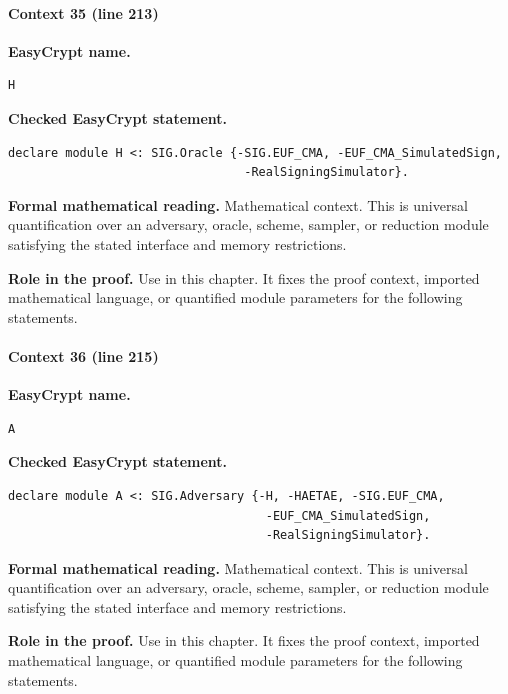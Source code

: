 \paragraph{Context 35 (line 213)}
\noindent\textbf{EasyCrypt name.}
\begin{lstlisting}[language=EasyCrypt,basicstyle=\ttfamily\scriptsize]
H
\end{lstlisting}
\noindent\textbf{Checked EasyCrypt statement.}
\begin{lstlisting}[language=EasyCrypt,basicstyle=\ttfamily\scriptsize]
declare module H <: SIG.Oracle {-SIG.EUF_CMA, -EUF_CMA_SimulatedSign,
                                 -RealSigningSimulator}.
\end{lstlisting}
\noindent\textbf{Formal mathematical reading.}
Mathematical context. This is universal quantification over an adversary, oracle, scheme, sampler, or reduction module satisfying the stated interface and memory restrictions.

\noindent\textbf{Role in the proof.}
Use in this chapter. It fixes the proof context, imported mathematical language, or quantified module parameters for the following statements.

\paragraph{Context 36 (line 215)}
\noindent\textbf{EasyCrypt name.}
\begin{lstlisting}[language=EasyCrypt,basicstyle=\ttfamily\scriptsize]
A
\end{lstlisting}
\noindent\textbf{Checked EasyCrypt statement.}
\begin{lstlisting}[language=EasyCrypt,basicstyle=\ttfamily\scriptsize]
declare module A <: SIG.Adversary {-H, -HAETAE, -SIG.EUF_CMA,
                                    -EUF_CMA_SimulatedSign,
                                    -RealSigningSimulator}.
\end{lstlisting}
\noindent\textbf{Formal mathematical reading.}
Mathematical context. This is universal quantification over an adversary, oracle, scheme, sampler, or reduction module satisfying the stated interface and memory restrictions.

\noindent\textbf{Role in the proof.}
Use in this chapter. It fixes the proof context, imported mathematical language, or quantified module parameters for the following statements.

